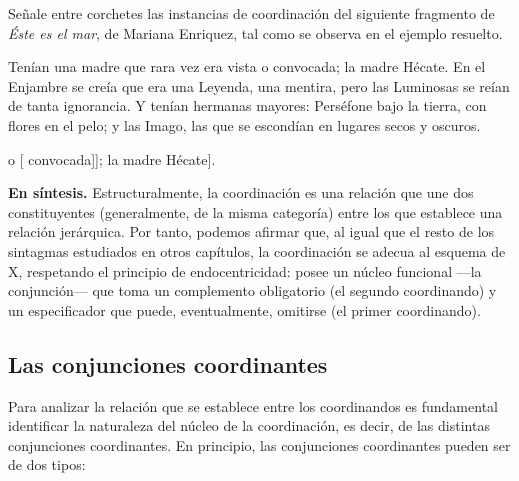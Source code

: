 \begin{ejercicio}\label{ej:12-enriquez}
Señale entre corchetes las instancias de coordinación del siguiente fragmento de
\textit{Éste es el mar}, de Mariana Enriquez, tal como se observa en el ejemplo
resuelto.

\begin{textolectura}
Tenían una madre que rara vez era vista o convocada; la madre Hécate. En el
Enjambre se creía que era una Leyenda, una mentira, pero las Luminosas se reían
de tanta ignorancia. Y tenían hermanas mayores: Perséfone bajo la tierra, con
flores en el pelo; y las Imago, las que se escondían en lugares secos y oscuros.
\end{textolectura}

\begin{resuelto}
[\etq{Oración 1} Tenían una madre que rara vez era
[\etq{SConj}\footnote{En este caso, la conjunción une dos formas verbales: los
dos auxiliados de la perífrasis de voz pasiva \forma{era vista o convocada}.
Como la coordinación se da dentro de la perífrasis verbal, el SConj no tiene
función sintáctica. Las perífrasis verbales se tratan en el
\capref{11}.\pendiente{El original dice «los dos auxiliares» y etiqueta
\textit{vista} y \textit{convocada} como Vaux}} [\etq{V/Esp} vista]
o [ convocada]]; la madre Hécate].
\end{resuelto}
\end{ejercicio}

\begin{destacado}
\textbf{En síntesis.} Estructuralmente, la coordinación es una relación que une
dos constituyentes (generalmente, de la misma categoría) entre los que establece
una relación jerárquica. Por tanto, podemos afirmar que, al igual que el resto de
los sintagmas estudiados en otros capítulos, la coordinación se adecua al esquema
de X\prima, respetando el principio de endocentricidad: posee un núcleo funcional
---la conjunción--- que toma un complemento obligatorio (el segundo coordinando) y
un especificador que puede, eventualmente, omitirse (el primer coordinando).
\end{destacado}

\subsection{Las conjunciones coordinantes}\label{sec:12-conjunciones}

Para analizar la relación que se establece entre los coordinandos es fundamental
identificar la naturaleza del núcleo de la coordinación, es decir, de las
distintas conjunciones coordinantes. En principio, las conjunciones coordinantes
pueden ser de dos tipos:

